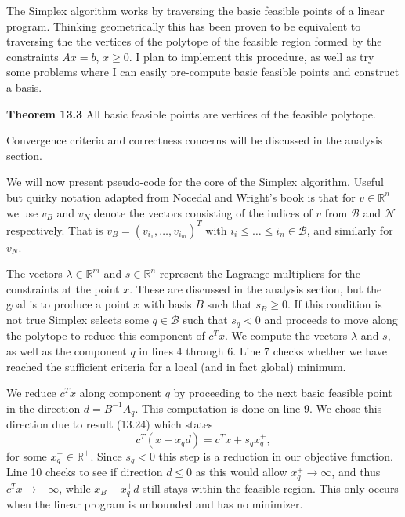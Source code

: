\documentclass[12pt]{amsart}
\begin{document}
The Simplex algorithm works by traversing the basic feasible points of a
linear program. Thinking geometrically this has been proven to be equivalent to
traversing the the vertices of the polytope of the feasible region formed by the
constraints $Ax=b$, $x\ge 0$. I plan to implement this procedure, as well as
try some problems where I can easily pre-compute basic feasible points and
construct a basis.

\textbf{Theorem 13.3} \cite{nocedalwright} All basic feasible points are
vertices of the feasible polytope.

Convergence criteria and correctness concerns will be discussed in the analysis
section.

We will now present pseudo-code for the core of the Simplex algorithm.
Useful but quirky notation adapted from Nocedal and Wright's book is that for $v\in\mathbb{R}^n$ we use
$v_B$ and $v_N$ denote the vectors consisting of the indices of $v$ from
$\mathcal{B}$ and $\mathcal{N}$ respectively. That is
$v_B=(v_{i_1},\ldots,v_{i_m})^T$ with $i_i\le\ldots\le i_n\in\mathcal{B}$, and
similarly for $v_N$.

The vectors $\lambda\in\mathbb{R}^m$ and $s\in\mathbb{R}^n$ represent the
Lagrange multipliers for the constraints at the point $x$. These are discussed
in the analysis section, but the goal is to produce a point $x$ with basis $B$
such that $s_B\ge 0$. If this condition is not true Simplex selects some
$q\in \mathcal{B}$ such that $s_q<0$ and proceeds to move along the polytope
to reduce this component of $c^Tx$. We compute the vectors $\lambda$ and $s$,
as well as the component $q$ in lines 4 through 6. Line 7 checks whether we
have reached the sufficient criteria for a local (and in fact global) minimum.

We reduce $c^Tx$ along component $q$ by proceeding to the next
basic feasible point in the direction $d=B^{-1}A_q$. This computation is done on
line 9. We chose this direction due to result (13.24) \cite{nocedalwright} which
states
\[
	c^T(x+x_q d) = c^Tx+s_qx_q^+,
\]
for some $x_q^+\in\mathbb{R}^+$. Since $s_q<0$ this step is a reduction in our
objective function. Line 10 checks to see if direction $d\le 0$ as this would allow
$x_q^+\rightarrow\infty$, and thus $c^Tx\rightarrow -\infty$, while $x_B-x_q^+d$
still stays within the feasible region. This only occurs when the linear program
is unbounded and has no minimizer.
\end{document}
